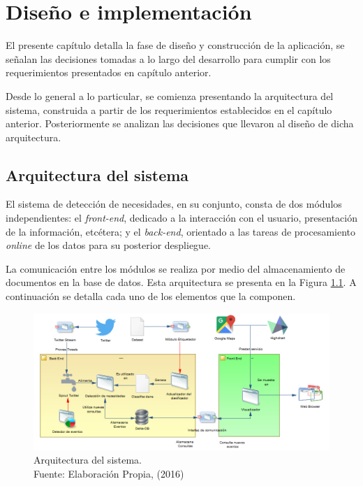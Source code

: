 \chapter{Diseño e implementación}
\label{cap:Diseno}

El presente capítulo detalla la fase de diseño y construcción de la aplicación, se señalan las decisiones tomadas a lo largo del desarrollo para cumplir con los requerimientos presentados en capítulo anterior.

Desde lo general a lo particular, se comienza presentando la arquitectura del sistema, construida a partir de los requerimientos establecidos en el capítulo anterior. Posteriormente se analizan las decisiones que llevaron al diseño de dicha arquitectura.

\section{Arquitectura del sistema}
\label{sec:Arquitectura}

El sistema de detección de necesidades, en su conjunto, consta de dos módulos independientes: el \textit{front-end}, dedicado a la interacción con el usuario, presentación de la información, etcétera; y el \textit{back-end}, orientado a las tareas de procesamiento \textit{online} de los datos para su posterior despliegue.

La comunicación entre los módulos se realiza por medio del almacenamiento de documentos en la base de datos. Esta arquitectura se presenta en la Figura \ref{fig:arquitecturaSistema}. A continuación se detalla cada uno de los elementos que la componen.

\begin{figure}[H]
	\centering
	\captionsetup{justification=centering}
	\includegraphics[scale=0.6]{images/arquitectura.png}
	\caption[Arquitectura del sistema.]{Arquitectura del sistema.\\Fuente: Elaboración Propia, (2016)}
	\label{fig:arquitecturaSistema}
\end{figure}


